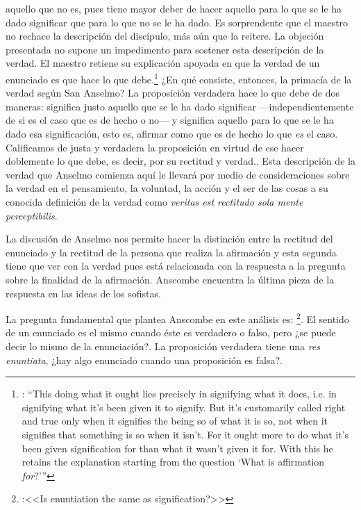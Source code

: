 aquello que no es, pues tiene mayor deber de hacer aquello para lo que se le ha dado significar que para lo que no se le ha dado. Es sorprendente que el maestro no rechace la descripción del discípulo, más aún que la reitere. La objeción presentada no supone un impedimento para sostener esta descripción de la verdad. El maestro retiene su explicación apoyada en que la verdad de un enunciado es que hace lo que debe.\footnote{\cite[Cf.~][76]{anscombe2011plato:truth}: \enquote{This doing what it ought lies precisely in signifying what it does, i.e. in signifying what it's been given it to signify. But it's customarily called right and true only when it signifies the being so of what it is so, not when it signifies that something is so when it isn't. For it ought more to do what it's been given signification for than what it wasn't given it for. With this he retains the explanation starting from the question `What is affirmation \emph{for}?'}} ¿En qué consiste, entonces, la primacía de la verdad según San Anselmo? La proposición verdadera hace lo que debe de dos maneras: significa justo aquello que se le ha dado significar ---independientemente de si es el caso que es de hecho o no--- y significa aquello para lo que se le ha dado esa significación, esto es, afirmar como que es de hecho lo que \emph{es} el caso. Calificamos de justa y verdadera la proposición en virtud de ese hacer doblemente lo que debe, es decir, por su rectitud y verdad.\autocite[Cf.~][497]{anselm1952obras:deveritate}. Esta descripción de la verdad que Anselmo comienza aquí le llevará por medio de consideraciones sobre la verdad en el pensamiento, la voluntad, la acción y el ser de las cosas a su conocida definición de la verdad como \emph{veritas est rectitudo sola mente perceptibilis}\autocite[522]{anselm1952obras:deveritate}.

La discusión de Anselmo nos permite hacer la distinción entre la rectitud del enunciado y la rectitud de la persona que realiza la afirmación y esta segunda tiene que ver con la verdad pues está relacionada con la respuesta a la pregunta sobre la finalidad de la afirmación. Anscombe encuentra la última pieza de la respuesta en las ideas de los sofistas.

   La pregunta fundamental que plantea Anscombe en este análisis es: \footnote{\cite[271]{anscombe2015logic:tsa}:<<Is enuntiation the same as signification?>>}. El sentido de un enunciado es el mismo cuando éste es verdadero o falso, pero ¿se puede decir lo mismo de la enunciación?. La proposición verdadera tiene una \emph{res enuntiata}, ¿hay algo enunciado cuando una proposición es falsa?.

